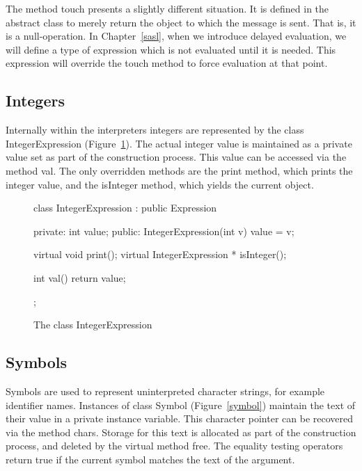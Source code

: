 The method {\sf touch} presents a slightly different situation.
It is defined in the abstract class to merely return the object to which
the message is sent.  That is, it is a null-operation.  In
Chapter~\ref{sasl}, when we introduce delayed evaluation, we will define a
type of expression which is not evaluated until it is needed.   This
expression will override the touch method to force evaluation at that point.

\subsection{Integers}

Internally within the interpreters integers are represented by the class
{\sf IntegerExpression} (Figure~\ref{integerexpr}).  The actual integer
value is maintained as a private value set as part of the construction
process.  This value can be accessed via the method {\sf val}.
The only overridden methods are the {\sf print} method, which prints the
integer value, and the {\sf isInteger} method, which yields the current
object.

\begin{figure}
\begin{cprog}
class IntegerExpression : public Expression {
private:
	int value;
public:
	IntegerExpression(int v) 
		{ value = v; }

	virtual void print();
	virtual IntegerExpression * isInteger();

	int val()
		{ return value; }
};
\end{cprog}
\caption{The class {\sf IntegerExpression}}\label{integerexpr}
\end{figure}

\subsection{Symbols}

Symbols are used to represent uninterpreted character strings, for example
identifier names.  Instances of class {\sf Symbol} (Figure~\ref{symbol})
maintain the text of their value in a private instance variable.  This
character pointer can be recovered via the method {\sf chars}.
Storage for this text is allocated as part of the construction process,
and deleted by the virtual method {\sf free}.  The equality testing
operators return true if the current symbol matches the text of the
argument.

